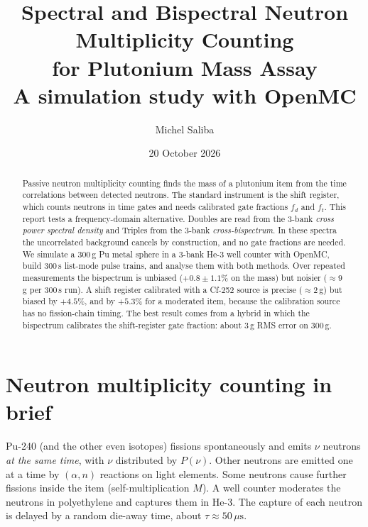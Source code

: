 \documentclass[11pt,a4paper]{article}
\title{Spectral and Bispectral Neutron Multiplicity Counting\\for Plutonium Mass Assay\\[4pt]
\large A simulation study with OpenMC}
\author{Michel Saliba}
\date{20 October 2026}
\newcommand{\us}{\,\mu\mathrm{s}}
\begin{document}
\maketitle

\begin{abstract}
\noindent
Passive neutron multiplicity counting finds the mass of a plutonium item from the time
correlations between detected neutrons. The standard instrument is the shift register,
which counts neutrons in time gates and needs calibrated gate fractions $f_d$ and $f_t$.
This report tests a frequency-domain alternative. Doubles are read from the 3-bank
\emph{cross power spectral density} and Triples from the 3-bank \emph{cross-bispectrum}.
In these spectra the uncorrelated background cancels by construction, and no gate
fractions are needed. We simulate a 300\,g Pu metal sphere in a 3-bank He-3 well counter
with OpenMC, build 300\,s list-mode pulse trains, and analyse them with both methods.
Over repeated measurements the bispectrum is unbiased ($+0.8\pm1.1\%$ on the mass) but noisier
($\approx9$\,g per 300\,s run). A shift register calibrated with a Cf-252 source is precise
($\approx2$\,g) but biased by $+4.5\%$, and by $+5.3\%$ for a moderated item, because the
calibration source has no fission-chain timing. The best result comes from a hybrid in which
the bispectrum calibrates the shift-register gate fraction: about 3\,g RMS error on 300\,g.
\end{abstract}

\tableofcontents

\section{Neutron multiplicity counting in brief}
Pu-240 (and the other even isotopes) fissions spontaneously and emits $\nu$ neutrons
\emph{at the same time}, with $\nu$ distributed by $P(\nu)$. Other neutrons are emitted
one at a time by $(\alpha,n)$ reactions on light elements. Some neutrons cause further
fissions inside the item (self-multiplication $M$). A well counter moderates the neutrons
in polyethylene and captures them in He-3. The capture of each neutron is delayed by a
random die-away time, about $\tau\approx50\us$.
\end{document}
